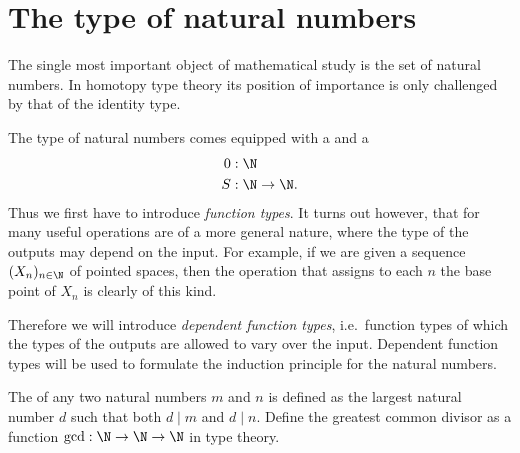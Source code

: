 \chapter{The type of natural numbers}

The single most important object of mathematical study is the set of natural numbers. In homotopy type theory its position of importance is only challenged by that of the identity type.

The type of natural numbers comes equipped with a  and a 
\begin{align*}
0 & : \N \\
S & : \N\to \N.
\end{align*}
Thus we first have to introduce \emph{function types}. 
It turns out however, that for many useful operations are of a more general nature, where the type of the outputs may depend on the input.  
For example, if we are given a sequence $(X_n)_{n\in\N}$ of pointed spaces, then the operation that assigns to each $n$ the base point of $X_n$ is clearly of this kind.

Therefore we will introduce \emph{dependent function types}, i.e.~function types of which the types of the outputs are allowed to vary over the input.
Dependent function types will be used to formulate the induction principle for the natural numbers.



\begin{exercises}
\item The  of any two natural numbers $m$ and $n$ is defined as the largest natural number $d$ such that both $d\mid m$ and $d\mid n$. Define the greatest common divisor as a function $\mathrm{gcd}:\N\to\N\to\N$ in type theory.
\end{exercises}
